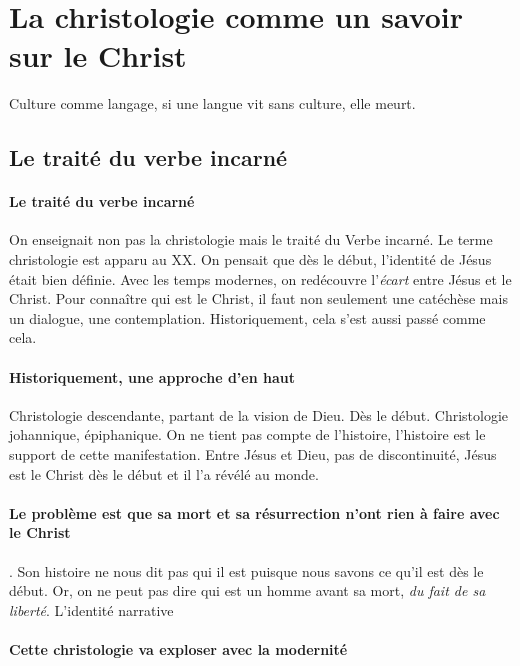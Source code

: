 \section{La christologie comme un savoir sur le Christ}

Culture comme langage, si une langue vit sans culture, elle meurt.

\subsection{Le traité du verbe incarné}
\paragraph{Le traité du verbe incarné} On enseignait non pas la christologie mais le traité du Verbe incarné. Le terme christologie est apparu au XX. On pensait que dès le début, l'identité de Jésus était bien définie. Avec les temps modernes, on redécouvre l'\textit{écart} entre Jésus et le Christ. Pour connaître qui est le Christ, il faut non seulement une catéchèse mais un dialogue, une contemplation. Historiquement, cela s'est aussi passé comme cela.

\paragraph{Historiquement, une approche d'en haut} Christologie descendante, partant de la vision de Dieu. Dès le début. Christologie johannique, épiphanique. On ne tient pas compte de l'histoire, l'histoire est le support de cette manifestation. Entre Jésus et Dieu, pas de discontinuité, Jésus est le Christ dès le début et il l'a révélé au monde.  

\paragraph{Le problème est que sa mort et sa résurrection n'ont rien à faire avec le Christ}. Son histoire ne nous dit pas qui il est puisque nous savons ce qu'il est dès le début. Or, on ne peut pas dire qui est un homme avant sa mort, \textit{du fait de sa liberté}. L'identité narrative  

\paragraph{Cette christologie va exploser avec la modernité}

